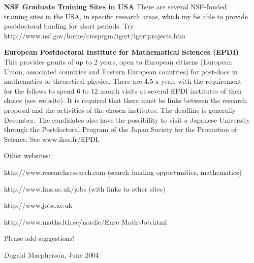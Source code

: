 \documentclass[a4,12pt]{article}
\begin{document}
\medskip

{\bf NSF Graduate Training Sites in USA}  There are several NSF-funded training 
sites in the USA, in specific research areas,
which my be able to provide postdoctoral funding for short periods. Try\\
http://www.nsf.gov/home/crssprgm/igert/igertprojects.htm

\medskip

{\bf European Postdoctoral Institute for Mathematical Sciences (EPDI)} This 
provides grants of up to 2 years, open to European citizens (European Union,
associated countries and Eastern European countries) for post-docs in
mathematics or theoretical physics. There are 4,5 a year, with the
requirement for the fellows to spend 6 to 12 month visits at several EPDI
institutes of their choice (see website). It is required that there
must be links between the research proposal and the activities of the
chosen institutes. The deadline is generally December. The candidates also
have the possibility to visit a Japanese University through the
Postdoctoral Program of the Japan Society for the Promotion of Science. See
www.ihes.fr/EPDI.


\medskip


Other websites:

http://www.researchresearch.com (search funding opportunities, mathematics)

http://www.lms.ac.uk/jobs (with links to other sites)

http://www.jobs.ac.uk

http://www.maths.lth.se/nordic/Euro-Math-Job.html

\medskip

Please add suggestions!

\medskip

Dugald Macpherson, June 2004
\end{document}
